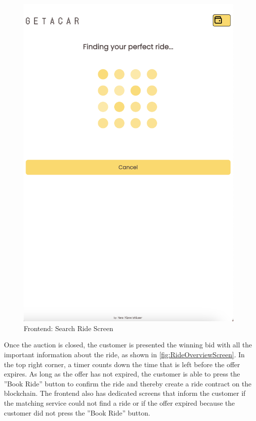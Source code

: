 \begin{figure}[H]
\begin{minipage}{0.45\linewidth}
        \includegraphics[width=\linewidth]{data/ffss/4.png}
        \caption{Frontend: Search Ride Screen}
        \label{fig:SearchRideScreen}
    \end{minipage}
    
\end{figure}

Once the auction is closed, the customer is presented the winning bid with all the important information about the ride, as shown in \ref{fig:RideOverviewScreen}. In the top right corner, a timer counts down the time that is left before the offer expires. As long as the offer has not expired, the customer is able to press the ''Book Ride'' button to confirm the ride and thereby create a ride contract on the blockchain. The frontend also has dedicated screens that inform the customer if the matching service could not find a ride or if the offer expired because the customer did not press the ''Book Ride'' button.

